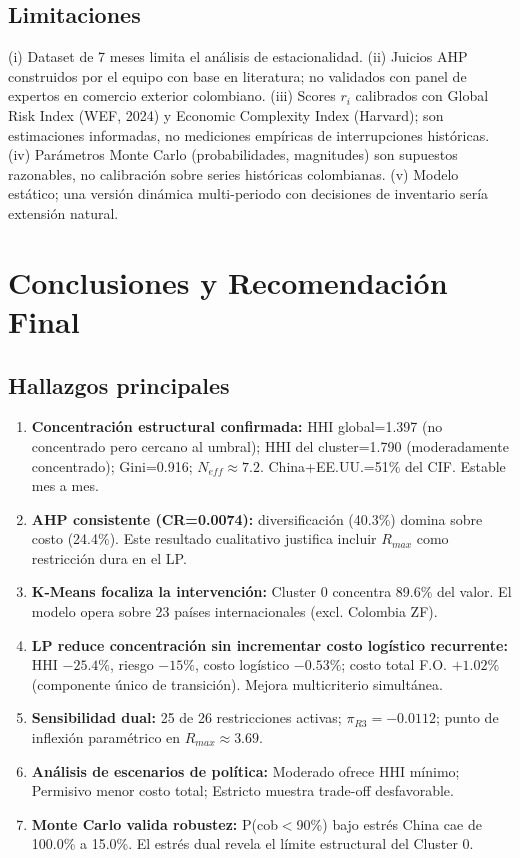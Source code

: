 \documentclass[11pt,a4paper]{article}
\begin{document}
\subsection{Limitaciones}

(i) Dataset de 7 meses limita el análisis de estacionalidad. (ii) Juicios AHP construidos por el equipo con base en literatura; no validados con panel de expertos en comercio exterior colombiano. (iii) Scores $r_i$ calibrados con Global Risk Index (WEF, 2024) y Economic Complexity Index (Harvard); son estimaciones informadas, no mediciones empíricas de interrupciones históricas. (iv) Parámetros Monte Carlo (probabilidades, magnitudes) son supuestos razonables, no calibración sobre series históricas colombianas. (v) Modelo estático; una versión dinámica multi-periodo con decisiones de inventario sería extensión natural.

\section{Conclusiones y Recomendación Final}

\subsection{Hallazgos principales}

\begin{enumerate}[leftmargin=1.2em, itemsep=0.02em, topsep=0pt]
\footnotesize
\item \textbf{Concentración estructural confirmada:} HHI global=1.397 (no concentrado pero cercano al umbral); HHI del cluster=1.790 (moderadamente concentrado); Gini=0.916; $N_{eff}\approx 7.2$. China+EE.UU.=51\% del CIF. Estable mes a mes.
\item \textbf{AHP consistente (CR=0.0074):} diversificación (40.3\%) domina sobre costo (24.4\%). Este resultado cualitativo justifica incluir $R_{max}$ como restricción dura en el LP.
\item \textbf{K-Means focaliza la intervención:} Cluster 0 concentra 89.6\% del valor. El modelo opera sobre 23 países internacionales (excl. Colombia ZF).
\item \textbf{LP reduce concentración sin incrementar costo logístico recurrente:} HHI $-25.4\%$, riesgo $-15\%$, costo logístico $-0.53\%$; costo total F.O. $+1.02\%$ (componente único de transición). Mejora multicriterio simultánea.
\item \textbf{Sensibilidad dual:} 25 de 26 restricciones activas; $\pi_{R3}=-0.0112$; punto de inflexión paramétrico en $R_{max}\approx 3.69$.
\item \textbf{Análisis de escenarios de política:} Moderado ofrece HHI mínimo; Permisivo menor costo total; Estricto muestra trade-off desfavorable.
\item \textbf{Monte Carlo valida robustez:} P(cob$<$90\%) bajo estrés China cae de 100.0\% a 15.0\%. El estrés dual revela el límite estructural del Cluster 0.
\end{enumerate}
\end{document}
